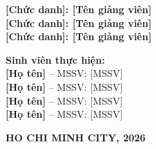 \documentclass[12pt,a4paper]{article}
\begin{document}
\begin{titlepage}
\begin{center}
    \vspace{10pt}
    
    \makebox[\textwidth][c]{\large\bfseries \color{black!70!black}[TIÊU ĐỀ ĐỒ ÁN - PA2]}
    
    \vspace{1.5cm}

    \begin{tcolorbox}[colback=blue!5!white, colframe=blue!50!black, width=0.9\textwidth, boxrule=0.8pt, arc=3pt, left=8pt, right=8pt]
        \textbf{[Chức danh]: [Tên giảng viên]}\\
        \textbf{[Chức danh]: [Tên giảng viên]}\\
        \textbf{[Chức danh]: [Tên giảng viên]}
    \end{tcolorbox}
    \vspace{1cm}

    \begin{tcolorbox}[colback=gray!10!white, colframe=gray!60!black, width=0.9\textwidth, boxrule=0.8pt, arc=3pt, left=8pt, right=8pt]
        \textbf{Sinh viên thực hiện:} \\
        {\textbf{[Họ tên]}} -- MSSV: {[MSSV]} \\ 
        {\textbf{[Họ tên]}} -- MSSV: {[MSSV]} \\
        {\textbf{[Họ tên]}} -- MSSV: {[MSSV]} \\
        {\textbf{[Họ tên]}} -- MSSV: {[MSSV]}
        
    \end{tcolorbox}

    \vfill
    {\large\textbf{HO CHI MINH CITY, 2026}}
\end{center}
\end{titlepage}


\tableofcontents        %
\newpage                %




\end{document}
